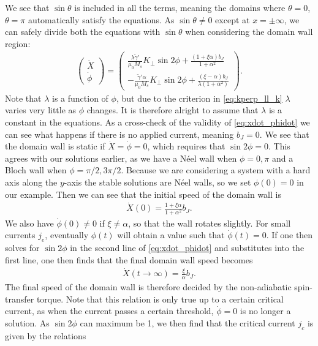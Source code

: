 \documentclass[12pt, a4paper, twoside, openright]{article}		%
\numberwithin{equation}{section}
\begin{document}
We see that $\sin\theta$ is included in all the terms, meaning the domains where $\theta = 0$, $\theta = \pi$ automatically satisfy the equations. As $\sin\theta \neq 0$ except at $x = \pm \infty$, we can safely divide both the equations with $\sin\theta$ when considering the domain wall region:
\begin{align}
\label{eq:xdot_phidot}
\begin{pmatrix}
\dot{X} \\ \dot{\phi}
\end{pmatrix}
=
\begin{pmatrix}
\frac{\lambda \tilde{\gamma}'}{\mu_0 M_s} K_{\perp} \sin2\phi + \frac{(1+\xi\alpha)b_J}{1+\alpha^2} \\
-\frac{\tilde{\gamma}'\alpha}{\mu_0 M_s} K_{\perp} \sin2\phi + \frac{(\xi-\alpha)b_J}{\lambda(1+\alpha^2)}
\end{pmatrix}.
\end{align}
Note that $\lambda$ is a function of $\phi$, but due to the criterion in \eqref{eq:kperp_ll_k} $\lambda$ varies very little as $\phi$ changes. It is therefore alright to assume that $\lambda$ is a constant in the equations. As a cross-check of the validity of \eqref{eq:xdot_phidot} we can see what happens if there is no applied current, meaning $b_J = 0$. We see that the domain wall is static if $\dot{X} = \dot{\phi} = 0$, which requires that $\sin2\phi = 0$. This agrees with our solutions earlier, as we have a N\'{e}el wall when $\phi = 0, \pi$ and a Bloch wall when $\phi = \pi/2, 3\pi/2$. Because we are considering a system with a hard axis along the $y$-axis the stable solutions are N\'{e}el walls, so we set $\phi(0) = 0$ in our example. Then we can see that the initial speed of the domain wall is
\begin{align}
\label{eq:Xdot0}
\dot{X}(0) = \frac{1+\xi\alpha}{1+\alpha^2}b_J.
\end{align}
We also have $\dot{\phi}(0) \neq 0$ if $\xi \neq \alpha$, so that the wall rotates slightly. For small currents $j_e$, eventually $\phi(t)$ will obtain a value such that $\dot{\phi}(t) = 0$. If one then solves for $\sin2\phi$ in the second line of \eqref{eq:xdot_phidot} and substitutes into the first line, one then finds that the final domain wall speed becomes
\begin{align}
\label{eq:xdot_undercrit}
\dot{X}(t\rightarrow\infty) = \frac{\xi}{\alpha} b_J.
\end{align}
The final speed of the domain wall is therefore decided by the non-adiabatic spin-transfer torque. Note that this relation is only true up to a certain critical current, as when the current passes a certain threshold, $\dot{\phi} = 0$ is no longer a solution. As $\sin2\phi$ can maximum be 1, we then find that the critical current $j_c$ is given by the relations
\end{document}
